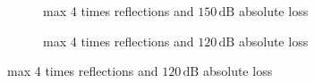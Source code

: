 \documentclass[12pt,DIV14,BCOR12mm,a4paper,footinclude=false,headinclude,parskip=half-,twoside,openright,cleardoublepage=empty,toc=index,bibliography=totoc,listof=totoc]{scrreprt}
\numberwithin{equation}{chapter}
\begin{document}
\begin{figure}[t]
    \centering
    \begin{subfigure}{0.45\textwidth}
        \centering
        \caption{max 4 times reflections and $150\,\mathrm{dB}$ absolute loss}
        \label{cfar detection with maxnumreflection=4 and maxabsolutepathloss=150dB}
    \end{subfigure}\hspace{0.5cm}
    \begin{subfigure}{0.45\textwidth}
        \centering
        \caption{max 4 times reflections and $120\,\mathrm{dB}$ absolute loss}

\end{subfigure}
\end{figure}
\end{document}
